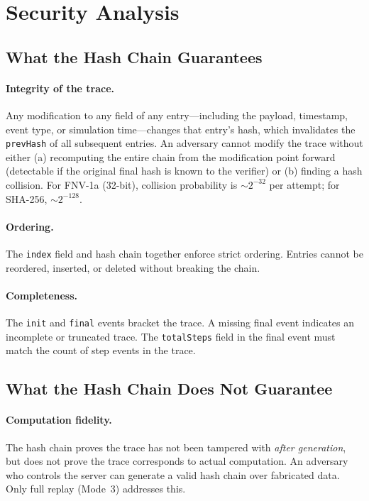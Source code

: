 \documentclass[letterpaper,twocolumn,10pt]{article}
\begin{document}

\section{Security Analysis}
\label{sec:security}

\subsection{What the Hash Chain Guarantees}

\paragraph{Integrity of the trace.} Any modification to any field of any
entry---including the payload, timestamp, event type, or simulation
time---changes that entry's hash, which invalidates the \texttt{prevHash} of
all subsequent entries. An adversary cannot modify the trace without either
(a) recomputing the entire chain from the modification point forward
(detectable if the original final hash is known to the verifier) or (b)
finding a hash collision. For FNV-1a (32-bit), collision probability is
$\sim 2^{-32}$ per attempt; for SHA-256, $\sim 2^{-128}$.

\paragraph{Ordering.} The \texttt{index} field and hash chain together
enforce strict ordering. Entries cannot be reordered, inserted, or deleted
without breaking the chain.

\paragraph{Completeness.} The \texttt{init} and \texttt{final} events
bracket the trace. A missing final event indicates an incomplete or
truncated trace. The \texttt{totalSteps} field in the final event must
match the count of step events in the trace.

\subsection{What the Hash Chain Does Not Guarantee}

\paragraph{Computation fidelity.} The hash chain proves the trace has not
been tampered with \emph{after generation}, but does not prove the trace
corresponds to actual computation. An adversary who controls the server can
generate a valid hash chain over fabricated data. Only full replay (Mode~3)
addresses this.
\end{document}
